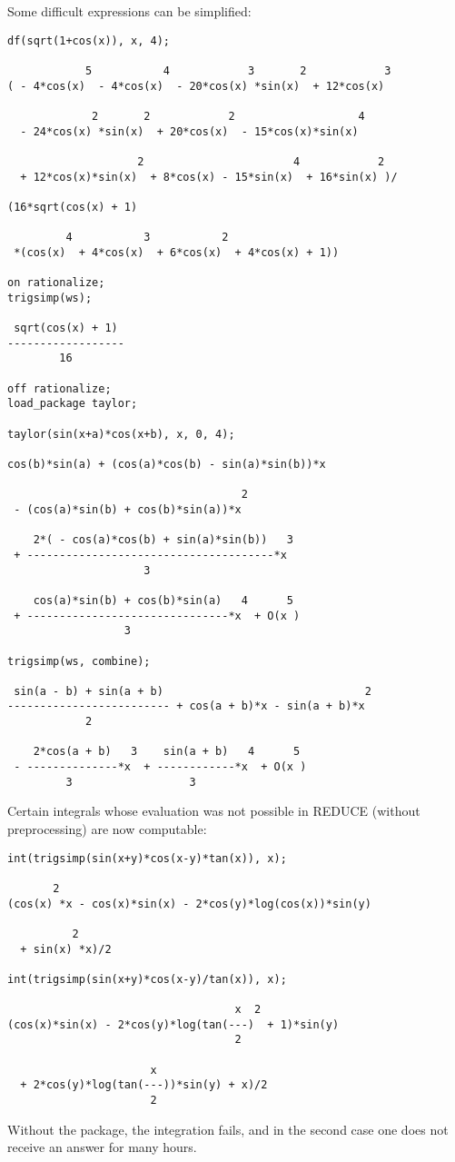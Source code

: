 \documentclass[11pt]{article}
\newcommand{\REDUCE}{REDUCE}
\begin{document}
Some difficult expressions can be simplified:
\begin{verbatim}
df(sqrt(1+cos(x)), x, 4);

            5           4            3       2            3
( - 4*cos(x)  - 4*cos(x)  - 20*cos(x) *sin(x)  + 12*cos(x)

             2       2            2                   4
  - 24*cos(x) *sin(x)  + 20*cos(x)  - 15*cos(x)*sin(x)

                    2                       4            2
  + 12*cos(x)*sin(x)  + 8*cos(x) - 15*sin(x)  + 16*sin(x) )/

(16*sqrt(cos(x) + 1)

         4           3           2
 *(cos(x)  + 4*cos(x)  + 6*cos(x)  + 4*cos(x) + 1))

on rationalize;
trigsimp(ws);

 sqrt(cos(x) + 1)
------------------
        16

off rationalize;
load_package taylor;

taylor(sin(x+a)*cos(x+b), x, 0, 4);

cos(b)*sin(a) + (cos(a)*cos(b) - sin(a)*sin(b))*x

                                    2
 - (cos(a)*sin(b) + cos(b)*sin(a))*x

    2*( - cos(a)*cos(b) + sin(a)*sin(b))   3
 + --------------------------------------*x
                     3

    cos(a)*sin(b) + cos(b)*sin(a)   4      5
 + -------------------------------*x  + O(x )
                  3

trigsimp(ws, combine);

 sin(a - b) + sin(a + b)                               2
------------------------- + cos(a + b)*x - sin(a + b)*x
            2

    2*cos(a + b)   3    sin(a + b)   4      5
 - --------------*x  + ------------*x  + O(x )
         3                  3
\end{verbatim}

Certain integrals whose evaluation was not possible in \REDUCE{}
(without preprocessing) are now computable:
\begin{verbatim}
int(trigsimp(sin(x+y)*cos(x-y)*tan(x)), x);

       2
(cos(x) *x - cos(x)*sin(x) - 2*cos(y)*log(cos(x))*sin(y)

          2
  + sin(x) *x)/2

int(trigsimp(sin(x+y)*cos(x-y)/tan(x)), x);

                                   x  2
(cos(x)*sin(x) - 2*cos(y)*log(tan(---)  + 1)*sin(y)
                                   2

                      x
  + 2*cos(y)*log(tan(---))*sin(y) + x)/2
                      2
\end{verbatim}
Without the package, the integration fails, and in the second case one
does not receive an answer for many hours.
\end{document}
